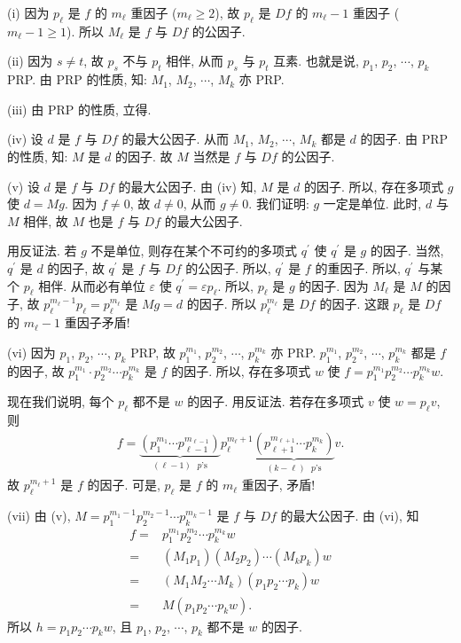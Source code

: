 \begin{pf}
    (i) 因为 $p_\ell$ 是 $f$ 的 $m_\ell$ 重因子 ($m_\ell \geq 2$), 故 $p_\ell$ 是 $Df$ 的 $m_\ell - 1$ 重因子 ($m_\ell - 1 \geq 1$). 所以 $M_\ell$ 是 $f$ 与 $Df$ 的公因子.

    (ii) 因为 $s \neq t$, 故 $p_s$ 不与 $p_t$ 相伴, 从而 $p_s$ 与 $p_t$ 互素. 也就是说, $p_1$, $p_2$, $\cdots$, $p_k$ PRP. 由 PRP 的性质, 知: $M_1$, $M_2$, $\cdots$, $M_k$ 亦 PRP.

    (iii) 由 PRP 的性质, 立得.

    (iv) 设 $d$ 是 $f$ 与 $Df$ 的最大公因子. 从而 $M_1$, $M_2$, $\cdots$, $M_k$ 都是 $d$ 的因子. 由 PRP 的性质, 知: $M$ 是 $d$ 的因子. 故 $M$ 当然是 $f$ 与 $Df$ 的公因子.

    (v) 设 $d$ 是 $f$ 与 $Df$ 的最大公因子. 由 (iv) 知, $M$ 是 $d$ 的因子. 所以, 存在多项式 $g$ 使 $d = Mg$. 因为 $f \neq 0$, 故 $d \neq 0$, 从而 $g \neq 0$. 我们证明: $g$ 一定是单位. 此时, $d$ 与 $M$ 相伴, 故 $M$ 也是 $f$ 与 $Df$ 的最大公因子.

    用反证法. 若 $g$ 不是单位, 则存在某个不可约的多项式 $q^{\prime}$ 使 $q^{\prime}$ 是 $g$ 的因子. 当然, $q^{\prime}$ 是 $d$ 的因子, 故 $q^{\prime}$ 是 $f$ 与 $Df$ 的公因子. 所以, $q^{\prime}$ 是 $f$ 的重因子. 所以, $q^{\prime}$ 与某个 $p_{\ell}$ 相伴. 从而必有单位 $\varepsilon$ 使 $q^{\prime} = \varepsilon p_{\ell}$. 所以, $p_{\ell}$ 是 $g$ 的因子. 因为 $M_\ell$ 是 $M$ 的因子, 故 $p_{\ell}^{m_\ell - 1} p_{\ell} = p_{\ell}^{m_\ell}$ 是 $Mg = d$ 的因子. 所以 $p_{\ell}^{m_\ell}$ 是 $Df$ 的因子. 这跟 $p_\ell$ 是 $Df$ 的 $m_\ell - 1$ 重因子矛盾!

    (vi) 因为 $p_1$, $p_2$, $\cdots$, $p_k$ PRP, 故 $p_1^{m_1}$, $p_2^{m_2}$, $\cdots$, $p_k^{m_k}$ 亦 PRP. $p_1^{m_1}$, $p_2^{m_2}$, $\cdots$, $p_k^{m_k}$ 都是 $f$ 的因子, 故 $p_1^{m_1} \cdot p_2^{m_2} \cdots p_k^{m_k}$ 是 $f$ 的因子. 所以, 存在多项式 $w$ 使 $f = p_1^{m_1} p_2^{m_2} \cdots p_k^{m_k} w$.

    现在我们说明, 每个 $p_\ell$ 都不是 $w$ 的因子. 用反证法. 若存在多项式 $v$ 使 $w = p_\ell v$, 则
    \begin{align*}
        f = \underbrace{(p_1^{m_1} \cdots p_{\ell-1}^{m_{\ell-1}})}_{\text{$(\ell - 1)$ $p$'s}} p_{\ell}^{m_\ell + 1} \underbrace{(p_{\ell+1}^{m_{\ell + 1}} \cdots p_k^{m_k})}_{\text{$(k-\ell)$ $p$'s}} v.
    \end{align*}
    故 $p_{\ell}^{m_\ell + 1}$ 是 $f$ 的因子. 可是, $p_\ell$ 是 $f$ 的 $m_\ell$ 重因子, 矛盾!

    (vii) 由 (v), $M = p_1^{m_1 - 1} p_2^{m_2 - 1} \cdots p_k^{m_k - 1}$ 是 $f$ 与 $Df$ 的最大公因子. 由 (vi), 知
    \begin{align*}
        f
        = {} & p_1^{m_1} p_2^{m_2} \cdots p_k^{m_k} w      \\
        = {} & (M_1 p_1) (M_2 p_2) \cdots (M_k p_k) w      \\
        = {} & (M_1 M_2 \cdots M_k) (p_1 p_2 \cdots p_k) w \\
        = {} & M (p_1 p_2 \cdots p_k w).
    \end{align*}
    所以 $h = p_1 p_2 \cdots p_k w$, 且 $p_1$, $p_2$, $\cdots$, $p_k$ 都不是 $w$ 的因子.


\end{pf}
